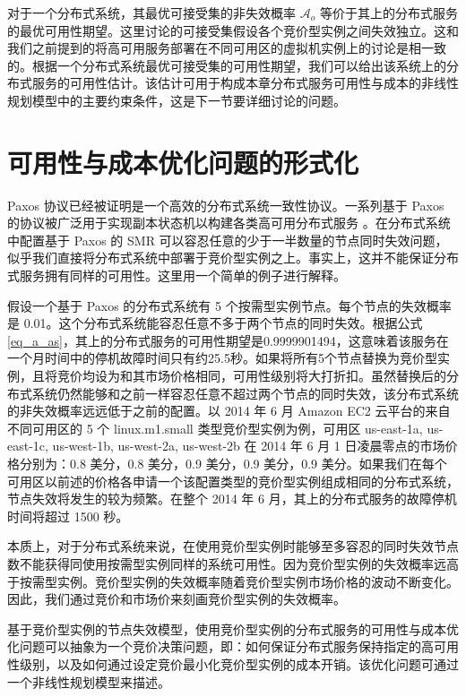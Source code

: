 对于一个分布式系统，其最优可接受集的非失效概率 $\mathcal{A}_{o}$ 等价于其上的分布式服务的最优可用性期望。这里讨论的可接受集假设各个竞价型实例之间失效独立。这和我们之前提到的将高可用服务部署在不同可用区的虚拟机实例上的讨论是相一致的。根据一个分布式系统最优可接受集的可用性期望，我们可以给出该系统上的分布式服务的可用性估计。该估计可用于构成本章分布式服务可用性与成本的非线性规划模型中的主要约束条件，这是下一节要详细讨论的问题。

\section{可用性与成本优化问题的形式化}
\label{jupiter-formulation}
Paxos \cite{lamport2001paxos}协议已经被证明是一个高效的分布式系统一致性协议。一系列基于 Paxos 的协议被广泛用于实现副本状态机以构建各类高可用分布式服务 \cite{Bolosky:2011:PRS:1972457.1972472, Burrows:2006:CLS:1298455.1298487, Mu:2014:PME:2600212.2600218}。在分布式系统中配置基于 Paxos 的 SMR 可以容忍任意的少于一半数量的节点同时失效问题，似乎我们直接将分布式系统中部署于竞价型实例之上。事实上，这并不能保证分布式服务拥有同样的可用性。这里用一个简单的例子进行解释。

假设一个基于 Paxos 的分布式系统有 5 个按需型实例节点。每个节点的失效概率是 0.01。这个分布式系统能容忍任意不多于两个节点的同时失效。根据公式\eqref{eq_a_as}，其上的分布式服务的可用性期望是0.9999901494，这意味着该服务在一个月时间中的停机故障时间只有约25.5秒。如果将所有5个节点替换为竞价型实例，且将竞价均设为和其市场价格相同，可用性级别将大打折扣。虽然替换后的分布式系统仍然能够和之前一样容忍任意不超过两个节点的同时失效，该分布式系统的非失效概率远远低于之前的配置。以 2014 年 6 月 Amazon EC2 云平台的来自不同可用区的 5 个 linux.m1.small 类型竞价型实例为例，可用区 us-east-1a, us-east-1c, us-west-1b, us-west-2a, us-west-2b 在 2014 年 6 月 1 日凌晨零点的市场价格分别为：0.8 美分，0.8 美分，0.9 美分，0.9 美分，0.9 美分。如果我们在每个可用区以前述的价格各申请一个该配置类型的竞价型实例组成相同的分布式系统，节点失效将发生的较为频繁。在整个 2014 年 6 月，其上的分布式服务的故障停机时间将超过 1500 秒。

本质上，对于分布式系统来说，在使用竞价型实例时能够至多容忍的同时失效节点数不能获得同使用按需型实例同样的系统可用性。因为竞价型实例的失效概率远高于按需型实例。竞价型实例的失效概率随着竞价型实例市场价格的波动不断变化。因此，我们通过竞价和市场价来刻画竞价型实例的失效概率。

基于竞价型实例的节点失效模型，使用竞价型实例的分布式服务的可用性与成本优化问题可以抽象为一个竞价决策问题，即：如何保证分布式服务保持指定的高可用性级别，以及如何通过设定竞价最小化竞价型实例的成本开销。该优化问题可通过一个非线性规划模型来描述。

